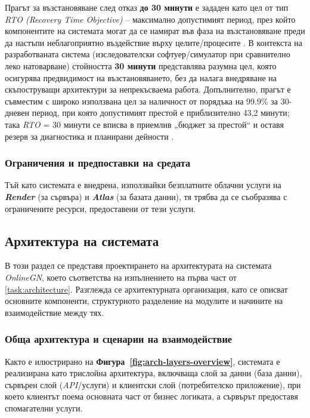 Прагът за възстановяване след отказ \textbf{до 30 минути} е зададен като цел от тип \textit{RTO (Recovery Time Objective)} -- максимално допустимият период, през който компонентите на системата могат да се намират във фаза на възстановяване преди да настъпи неблагоприятно въздействие върху целите/процесите \cite{NIST80034r1,NISTRTOGlossary}. В контекста на разработваната система (изследователски софтуер/симулатор при сравнително леко натоварване) стойността \textbf{30 минути} представлява разумна цел, която осигурява предвидимост на възстановяването, без да налага внедряване на скъпоструващи архитектури за непрекъсваема работа. Допълнително, прагът е съвместим с широко използвана цел за наличност от порядъка на 99.9\% за 30-дневен период, при която допустимият престой е приблизително 43,2 минути; така \textit{RTO} = 30 минути се вписва в приемлив „бюджет за престой“ и оставя резерв за диагностика и планирани дейности \cite{AtlassianSLO,BetterStackAvailability}.

\vspace{0.25cm}

\subsubsection{Ограничения и предпоставки на средата}

\hspace*{2.5em}Тъй като системата е внедрена, използвайки безплатните облачни услуги на \textbf{\textit{Render}} (за сървъра) и \textbf{\textit{Atlas}} (за базата данни), тя трябва да се съобразява с ограничените ресурси, предоставени от тези услуги.

\vspace{0.4cm}

\subsection{Архитектура на системата} 
\hspace*{2.5em}В този раздел се представя проектирането на архитектурата на системата \textit{OnlineGN}, което съответства на изпълнението на първа част от \ref{task:architecture}. Разглежда се архитектурната организация, като се описват основните компоненти, структурното разделение на модулите и начините на взаимодействие между тях.

\subsubsection{Обща архитектура и сценарии на взаимодействие}
\hspace*{2.5em}
Както е илюстрирано на \textbf{Фигура~\ref{fig:arch-layers-overview}}, системата е реализирана като трислойна архитектура, включваща слой за данни (база данни), сървърен слой (\textit{API}/услуги) и клиентски слой (потребителско приложение), при което клиентът поема основната част от бизнес логиката, а сървърът предоставя спомагателни услуги.


